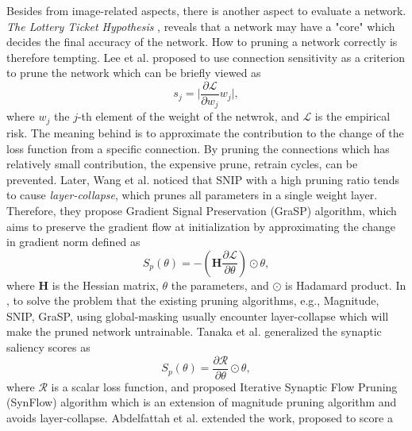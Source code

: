 \documentclass[sigconf]{acmart}
\begin{document}
    Besides from image-related aspects, there is another aspect to evaluate a network. 
    \textit{The Lottery Ticket Hypothesis} \cite{frankle2019lottery}, reveals that a 
    network may have a "core" which decides the final accuracy of the network. 
    How to pruning a network correctly is therefore tempting. Lee et al. 
    \cite{lee2019snip} proposed to use connection sensitivity as a criterion to prune 
    the network which can be briefly viewed as 
    \begin{equation}
        \label{equ:snip_connection_sensitivity}
        s_j=\lvert \frac{\partial \mathcal L}{\partial w_j}w_j\rvert,
    \end{equation}
    where $w_j$ the $j$-th element of the weight of the netwrok, and $\mathcal L$ is 
    the empirical risk. The meaning behind is to approximate the contribution 
    to the change of the loss function from a specific connection. By pruning the 
    connections which has relatively small contribution, the expensive prune, retrain 
    cycles, can be prevented. 
    Later, Wang et al. \cite{wang2020picking} noticed that SNIP with a high pruning ratio 
    tends to cause \textit{layer-collapse}, which prunes all parameters in a single weight 
    layer. Therefore, they propose Gradient Signal Preservation (GraSP) algorithm, which 
    aims to preserve the gradient flow at initialization by approximating the change in 
    gradient norm defined as 
    \begin{equation}
        \label{equ:grap}
        S_p(\theta)=-(\textbf{H}\frac{\partial \mathcal L}{\partial \theta})\odot\theta,
    \end{equation}
    where $\textbf{H}$ is the Hessian matrix, $\theta$ the parameters, and $\odot$ is Hadamard product. 
    In \cite{tanaka2020pruning}, to solve the problem that the existing pruning algorithms, e.g., 
    Magnitude, SNIP, GraSP, using global-masking usually encounter layer-collapse which will make 
    the pruned network untrainable. 
    Tanaka et al. generalized the synaptic saliency scores as 
    \begin{equation}
        \label{equ:synflow}
        S_p(\theta)=\frac{\partial \mathcal R}{\partial \theta}\odot\theta,
    \end{equation}
    where $\mathcal R$ is a scalar loss function, and proposed Iterative Synaptic Flow Pruning (SynFlow) 
    algorithm which is an extension of magnitude pruning algorithm and avoids layer-collapse. 
    Abdelfattah et al. \cite{abdelfattah2021zerocost} extended the work, proposed to score a 
\end{document}
